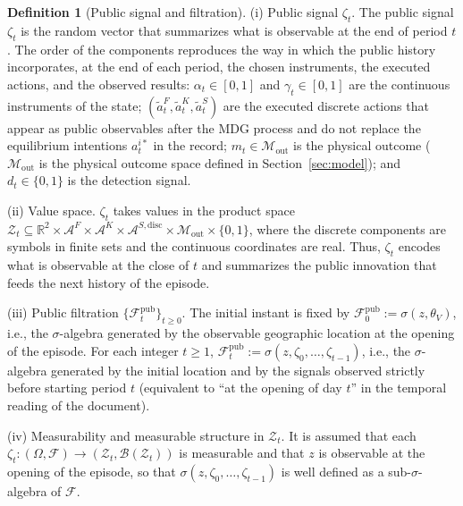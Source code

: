 \documentclass[ecta,nameyear,draft]{econsocart}
\theoremstyle{plain}
\theoremstyle{definition}
\newtheorem{definition}[theorem]{Definition}
\newcommand{\1}{\mathbf{1}}
\begin{document}
\begin{definition}[Public signal and filtration]
\label{def:zeta-filtration}
\noindent\textup{(i)} Public signal $\zeta_t$.\quad
The public signal $\zeta_t$ is the random vector that summarizes what is observable at the end of period $t$. The order of the components reproduces the way in which the public history incorporates, at the end of each period, the chosen instruments, the executed actions, and the observed results:
 $\alpha_t\in[0,1]$ and $\gamma_t\in[0,1]$ are the continuous instruments of the state; $(\tilde{a}_t^F,\tilde{a}_t^K,\tilde{a}_t^S)$ are the executed discrete actions that appear as public observables after the MDG process and do not replace the equilibrium intentions $a_t^{i\ast}$ in the record; $m_t\in\mathcal{M}_{\mathrm{out}}$ is the physical outcome \textup{(}$\mathcal{M}_{\mathrm{out}}$ is the physical outcome space defined in Section~\ref{sec:model}\textup{)}; and $d_t\in\{0,1\}$ is the detection signal.

\medskip
\noindent\textup{(ii)} Value space.\quad
$\zeta_t$ takes values in the product space $\mathcal{Z}_t \subseteq \mathbb{R}^2 \times \mathcal{A}^F \times \mathcal{A}^K \times \mathcal{A}^{S,\mathrm{disc}} \times \mathcal{M}_{\mathrm{out}} \times \{0,1\}$, where the discrete components are symbols in finite sets and the continuous coordinates are real. Thus, $\zeta_t$ encodes what is observable at the close of $t$ and summarizes the public innovation that feeds the next history of the episode.

\medskip
\noindent\textup{(iii)} Public filtration $\{\mathcal{F}_t^{\mathrm{pub}}\}_{t\ge 0}$.\quad
The initial instant is fixed by $\mathcal{F}_0^{\mathrm{pub}}:=\sigma(z, \theta_V)$, i.e., the $\sigma$-algebra generated by the observable geographic location at the opening of the episode. For each integer $t\ge 1$, $\mathcal{F}_t^{\mathrm{pub}}:=\sigma(z,\zeta_0,\ldots,\zeta_{t-1})$, i.e., the $\sigma$-algebra generated by the initial location and by the signals observed strictly before starting period $t$ \textup{(}equivalent to ``at the opening of day $t$'' in the temporal reading of the document\textup{)}.

\smallskip
\noindent\textup{(iv)} Measurability and measurable structure in $\mathcal{Z}_t$.\quad
It is assumed that each $\zeta_t:(\Omega,\mathcal{F})\to(\mathcal{Z}_t,\mathcal{B}(\mathcal{Z}_t))$ is measurable and that $z$ is observable at the opening of the episode, so that $\sigma(z,\zeta_0,\ldots,\zeta_{t-1})$ is well defined as a sub-$\sigma$-algebra of $\mathcal{F}$.
\end{definition}
\end{document}
